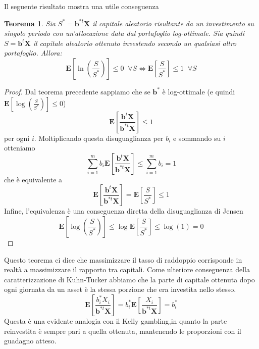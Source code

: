 \documentclass[a4paper,11pt]{book}
\theoremstyle{plain}
\newtheorem{teo}{Teorema}[chapter]
\theoremstyle{definition}
\theoremstyle{remark}
\newcommand{\X}{\bm{X}}
\newcommand{\B}{\bm{b}}
\begin{document}
Il seguente risultato mostra una utile conseguenza
\begin{teo}
	Sia $S^*=\B^{*t}\X$ il capitale aleatorio risultante da un investimento su singolo periodo con un'allocazione data dal portafoglio log-ottimale. Sia quindi $S = \B^t\X$ il capitale aleatorio ottenuto investendo secondo un qualsiasi altro portafoglio. Allora:
	\begin{equation*}
		\mathbf{E}\left[\ln\left(\frac{S}{S^*}\right)\right]\leq 0 \;\; \forall S \iff \mathbf{E}\left[\frac{S}{S^*}\right]\leq 1 \;\; \forall S
	\end{equation*}
\end{teo}
\begin{proof}
	Dal teorema precedente sappiamo che se $\B^*$ è log-ottimale (e quindi $\mathbf{E}\left[\log\left(\frac{S}{S^*}\right)\right]\leq 0$)
	\begin{equation*}
		\mathbf{E}\left[\frac{\B^t\X}{\B^{*t}\X}\right]\leq 1
	\end{equation*}
	per ogni $i$. Moltiplicando questa disuguaglianza per $b_i$ e sommando su $i$ otteniamo
	\begin{equation*}
		\sum_{i = 1}^{m}{b_i\mathbf{E}\left[\frac{\B^t\X}{\B^{*t}\X}\right]}\leq \sum_{i=1}^{m}{b_i} = 1
	\end{equation*}
	che è equivalente a
	\begin{equation*}
		\mathbf{E}\left[\frac{\B^t\X}{\B^{*t}\X}\right]	= \mathbf{E}\left[\frac{S}{S^*}\right]\leq 1
	\end{equation*}
	Infine, l'equivalenza è una conseguenza diretta della disuguaglianza di Jensen
	\begin{equation*}
		\mathbf{E}\left[\log\left(\frac{S}{S^*}\right)\right]\leq
		\log \mathbf{E}\left[\frac{S}{S^*}\right]\leq \log(1)=0
	\end{equation*}
\end{proof}
Questo teorema ci dice che massimizzare il tasso di raddoppio corrisponde in realtà a massimizzare il rapporto tra capitali.\newline
Come ulteriore conseguenza della caratterizzazione di Kuhn-Tucker abbiamo che la parte di capitale ottenuta dopo ogni giornata da un asset è la stessa porzione che era investita nello stesso.
\begin{equation*}
	\mathbf{E}\left[\frac{b^*_iX_i}{\B^{*t}\X}\right]= b^*_i\mathbf{E}\left[\frac{X_i}{\B^{*t}\X}\right]=b^*_i
\end{equation*}
Questa è una evidente analogia con il Kelly gambling,in quanto la parte reinvestita è sempre pari a quella ottenuta, mantenendo le proporzioni con il guadagno atteso.
\end{document}
